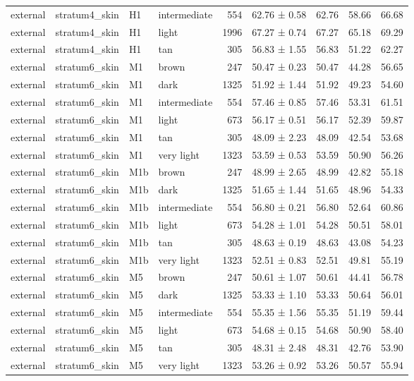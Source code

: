 \begin{tabular}{llllrlrrr}
external & stratum4\_skin & H1 & intermediate & 554 & 62.76 ± 0.58 & 62.76 & 58.66 & 66.68 \\
external & stratum4\_skin & H1 & light & 1996 & 67.27 ± 0.74 & 67.27 & 65.18 & 69.29 \\
external & stratum4\_skin & H1 & tan & 305 & 56.83 ± 1.55 & 56.83 & 51.22 & 62.27 \\
external & stratum6\_skin & M1 & brown & 247 & 50.47 ± 0.23 & 50.47 & 44.28 & 56.65 \\
external & stratum6\_skin & M1 & dark & 1325 & 51.92 ± 1.44 & 51.92 & 49.23 & 54.60 \\
external & stratum6\_skin & M1 & intermediate & 554 & 57.46 ± 0.85 & 57.46 & 53.31 & 61.51 \\
external & stratum6\_skin & M1 & light & 673 & 56.17 ± 0.51 & 56.17 & 52.39 & 59.87 \\
external & stratum6\_skin & M1 & tan & 305 & 48.09 ± 2.23 & 48.09 & 42.54 & 53.68 \\
external & stratum6\_skin & M1 & very light & 1323 & 53.59 ± 0.53 & 53.59 & 50.90 & 56.26 \\
external & stratum6\_skin & M1b & brown & 247 & 48.99 ± 2.65 & 48.99 & 42.82 & 55.18 \\
external & stratum6\_skin & M1b & dark & 1325 & 51.65 ± 1.44 & 51.65 & 48.96 & 54.33 \\
external & stratum6\_skin & M1b & intermediate & 554 & 56.80 ± 0.21 & 56.80 & 52.64 & 60.86 \\
external & stratum6\_skin & M1b & light & 673 & 54.28 ± 1.01 & 54.28 & 50.51 & 58.01 \\
external & stratum6\_skin & M1b & tan & 305 & 48.63 ± 0.19 & 48.63 & 43.08 & 54.23 \\
external & stratum6\_skin & M1b & very light & 1323 & 52.51 ± 0.83 & 52.51 & 49.81 & 55.19 \\
external & stratum6\_skin & M5 & brown & 247 & 50.61 ± 1.07 & 50.61 & 44.41 & 56.78 \\
external & stratum6\_skin & M5 & dark & 1325 & 53.33 ± 1.10 & 53.33 & 50.64 & 56.01 \\
external & stratum6\_skin & M5 & intermediate & 554 & 55.35 ± 1.56 & 55.35 & 51.19 & 59.44 \\
external & stratum6\_skin & M5 & light & 673 & 54.68 ± 0.15 & 54.68 & 50.90 & 58.40 \\
external & stratum6\_skin & M5 & tan & 305 & 48.31 ± 2.48 & 48.31 & 42.76 & 53.90 \\
external & stratum6\_skin & M5 & very light & 1323 & 53.26 ± 0.92 & 53.26 & 50.57 & 55.94 \\

\end{tabular}
